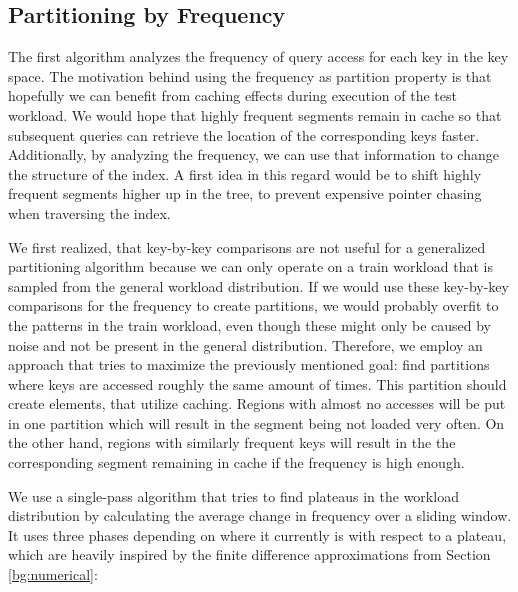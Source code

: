 \subsection{Partitioning by Frequency} \label{sec:frequency}
The first algorithm analyzes the frequency of query access for each key in the key space. The motivation behind using the frequency as partition property is that hopefully we can benefit from caching effects during execution of the test workload. We would hope that highly frequent segments remain in cache so that subsequent queries can retrieve the location of the corresponding keys faster. Additionally, by analyzing the frequency, we can use that information to change the structure of the index. A first idea in this regard would be to shift highly frequent segments higher up in the tree, to prevent expensive pointer chasing when traversing the index.

We first realized, that key-by-key comparisons are not useful for a generalized partitioning algorithm because we can only operate on a train workload that is sampled from the general workload distribution. If we would use these key-by-key comparisons for the frequency to create partitions, we would probably overfit to the patterns in the train workload, even though these might only be caused by noise and not be present in the general distribution. Therefore, we employ an approach that tries to maximize the previously mentioned goal: find partitions where keys are accessed roughly the same amount of times. This partition should create elements, that utilize caching. Regions with almost no accesses will be put in one partition which will result in the segment being not loaded very often. On the other hand, regions with similarly frequent keys will result in the the corresponding segment remaining in cache if the frequency is high enough.

We use a single-pass algorithm that tries to find plateaus in the workload distribution by calculating the average change in frequency over a sliding window. It uses three phases depending on where it currently is with respect to a plateau, which are heavily inspired by the finite difference approximations from Section \ref{bg:numerical}:

